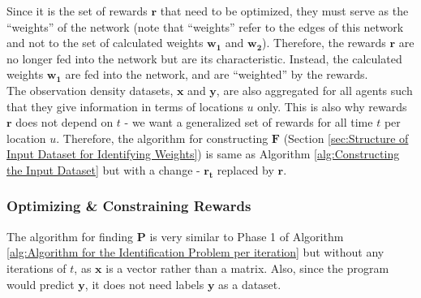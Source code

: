 \documentclass[12pt]{article}
\newcommand{\vect}[1]{\mathbf{#1}}  %
\newcommand{\matr}[1]{\mathbf{#1}}  %
\begin{document}
    Since it is the set of rewards $\vect{r}$ that need to be optimized, they must serve as the ``weights'' of the network (note that ``weights'' refer to the edges of this network and not to the set of calculated weights $\matr{w_1}$ and $\matr{w_2}$). Therefore, the rewards $\vect{r}$ are no longer fed into the network but are its characteristic. Instead, the calculated weights $\matr{w_1}$ are fed into the network, and are ``weighted'' by the rewards.\\
    
    The observation density datasets, $\matr{x}$ and $\matr{y}$, are also aggregated for all agents such that they give information in terms of locations $u$ only. This is also why rewards $\vect{r}$ does not depend on $t$ - we want a generalized set of rewards for all time $t$ per location $u$. Therefore, the algorithm for constructing $\matr{F}$ (Section \ref{sec:Structure of Input Dataset for Identifying Weights}) is same as Algorithm \ref{alg:Constructing the Input Dataset} but with a change - $\vect{r_t}$ replaced by $\vect{r}$.
    
    \subsubsection{Optimizing \& Constraining Rewards}
    The algorithm for finding $\matr{P}$ is very similar to Phase 1 of Algorithm \ref{alg:Algorithm for the Identification Problem per iteration} but without any iterations of $t$, as $\vect{x}$ is a vector rather than a matrix. Also, since the program would predict $\vect{y}$, it does not need labels $\vect{y}$ as a dataset.\\
    
\end{document}
